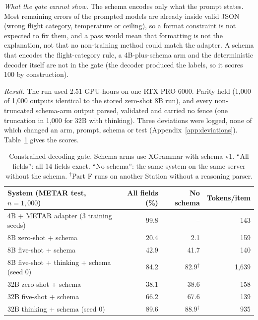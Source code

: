 \documentclass[11pt]{article}
\begin{document}
\emph{What the gate cannot show.} The schema encodes only what the prompt states. Most remaining errors of the
prompted models are already inside valid JSON (wrong flight category, temperature or ceiling), so a format constraint
is not expected to fix them, and a pass would mean that formatting is not the explanation, not that no non-training
method could match the adapter. A schema that encodes the flight-category rule, a 4B-plus-schema arm and the
deterministic decoder itself are not in the gate (the decoder produced the labels, so it scores 100 by construction).

\emph{Result.} The run used 2.51 GPU-hours on one RTX PRO 6000. Parity held (1,000 of 1,000 outputs identical to
the stored zero-shot 8B run), and every non-truncated schema-arm output parsed, validated and carried no fence (one
truncation in 1,000 for 32B with thinking). Three deviations were logged, none of which changed an arm, prompt, schema or
test (Appendix~\ref{app:deviations}). Table~\ref{tab:gate} gives the scores.

\begin{table}[t]
\centering
\small
\begin{tabular}{lrrr}
\toprule
System (METAR test, $n=1{,}000$) & All fields (\%) & No schema & Tokens/item \\
\midrule
4B + METAR adapter (3 training seeds) & 99.8 & -- & 143 \\
8B zero-shot + schema & 20.4 & 2.1 & 159 \\
8B five-shot + schema & 42.9 & 41.7 & 140 \\
8B five-shot + thinking + schema (seed 0) & 84.2 & 82.9$^\dagger$ & 1,639 \\
32B zero-shot + schema & 38.1 & 38.6 & 158 \\
32B five-shot + schema & 66.2 & 67.6 & 139 \\
32B thinking + schema (seed 0) & 89.6 & 88.9$^\dagger$ & 935 \\
\bottomrule
\end{tabular}
\caption{Constrained-decoding gate. Schema arms use XGrammar with schema v1. ``All fields'': all 14 fields exact.
``No schema'': the same system on the same server without the schema. $^\dagger$Part F runs on another Station
without a reasoning parser.}
\label{tab:gate}
\end{table}
\end{document}
